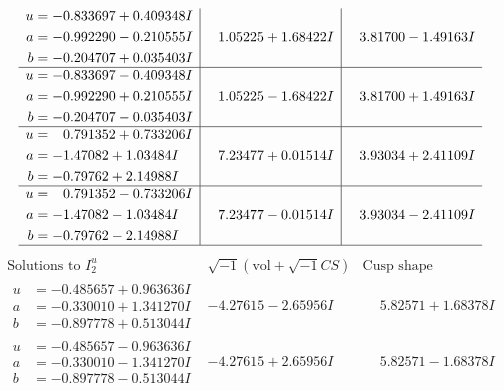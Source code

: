 \documentclass[1p]{elsarticle_modified}
\theoremstyle{definition}
\newcommand{\I}{\sqrt{-1}}
\begin{document}
$$\begin{array}{c|c|c}
\begin{aligned}
u &= -0.833697 + 0.409348 I \\
a &= -0.992290 - 0.210555 I \\
b &= -0.204707 + 0.035403 I\end{aligned}
 & \phantom{-}1.05225 + 1.68422 I & \phantom{-}3.81700 - 1.49163 I \\ \hline\begin{aligned}
u &= -0.833697 - 0.409348 I \\
a &= -0.992290 + 0.210555 I \\
b &= -0.204707 - 0.035403 I\end{aligned}
 & \phantom{-}1.05225 - 1.68422 I & \phantom{-}3.81700 + 1.49163 I \\ \hline\begin{aligned}
u &= \phantom{-}0.791352 + 0.733206 I \\
a &= -1.47082 + 1.03484 I \\
b &= -0.79762 + 2.14988 I\end{aligned}
 & \phantom{-}7.23477 + 0.01514 I & \phantom{-}3.93034 + 2.41109 I \\ \hline\begin{aligned}
u &= \phantom{-}0.791352 - 0.733206 I \\
a &= -1.47082 - 1.03484 I \\
b &= -0.79762 - 2.14988 I\end{aligned}
 & \phantom{-}7.23477 - 0.01514 I & \phantom{-}3.93034 - 2.41109 I\\
 \hline 
 \end{array}$$\newpage$$\begin{array}{c|c|c}  
\text{Solutions to }I^u_{2}& \I (\text{vol} + \sqrt{-1}CS) & \text{Cusp shape}\\
 \hline 
\begin{aligned}
u &= -0.485657 + 0.963636 I \\
a &= -0.330010 + 1.341270 I \\
b &= -0.897778 + 0.513044 I\end{aligned}
 & -4.27615 - 2.65956 I & \phantom{-}5.82571 + 1.68378 I \\ \hline\begin{aligned}
u &= -0.485657 - 0.963636 I \\
a &= -0.330010 - 1.341270 I \\
b &= -0.897778 - 0.513044 I\end{aligned}
 & -4.27615 + 2.65956 I & \phantom{-}5.82571 - 1.68378 I \\ \hline\begin{aligned}

\end{aligned}
\end{array}$$
\end{document}
